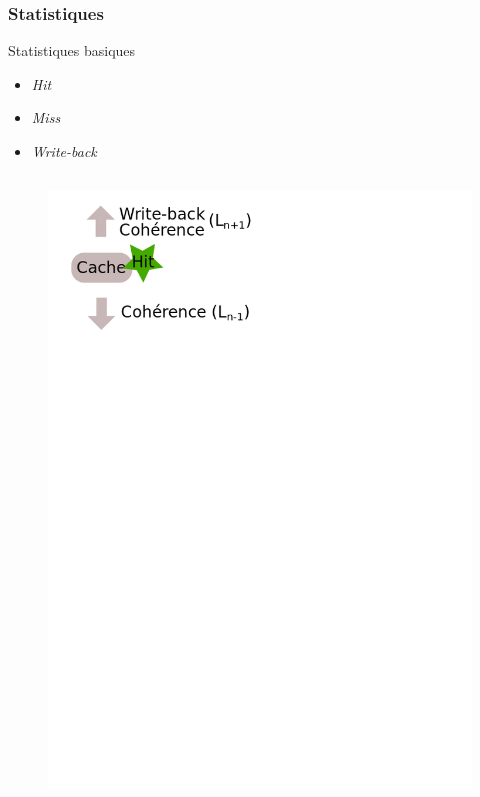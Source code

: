 \begin{frame}[fragile]
  \frametitle{Statistiques}
  
  \begin{block}{Statistiques basiques}
    \begin{itemize}
    \item{\emph{Hit}}
    \item{\emph{Miss}}
    \item{\emph{Write-back}}
    \end{itemize}
  \end{block}
  
  \begin{columns}[T]
    \begin{column}{.5\textwidth}
      \begin{figure}[h!]
	\includegraphics[scale=.4]{images/evictions.png}
      \end{figure}

\end{column}
\end{columns}
\end{frame}

